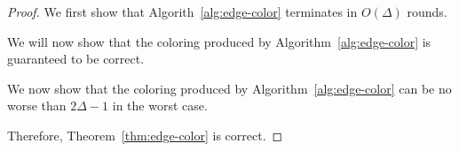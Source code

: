 \begin{proof}
We first show that Algorith~\ref{alg:edge-color} terminates in $O(\Delta)$ rounds.


We will now show that the coloring produced by Algorithm~\ref{alg:edge-color} is guaranteed to be correct.

We now show that the coloring produced by Algorithm~\ref{alg:edge-color} can be no worse than $2\Delta - 1$ in the worst case.

Therefore, Theorem~\ref{thm:edge-color} is correct.
\end{proof}
